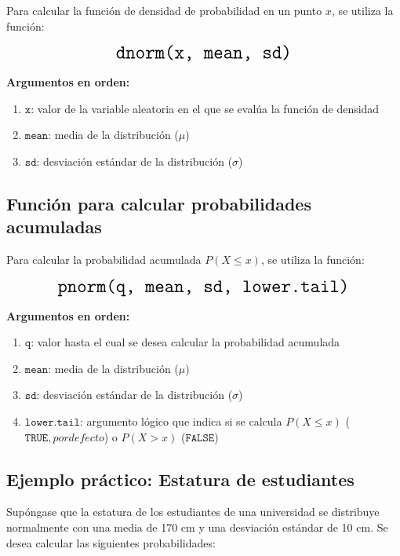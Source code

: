 \documentclass[
  spanish,
  letterpaper,
]{book}
\begin{document}
Para calcular la función de densidad de probabilidad en un punto \(x\),
se utiliza la función:

\[\LARGE \texttt{dnorm(x, mean, sd)}  \]

\textbf{Argumentos en orden:}

\begin{enumerate}
\def\labelenumi{\arabic{enumi}.}
\item
  \(\texttt{x}\): valor de la variable aleatoria en el que se evalúa la
  función de densidad
\item
  \(\texttt{mean}\): media de la distribución (\(\mu\))
\item
  \(\texttt{sd}\): desviación estándar de la distribución (\(\sigma\))
\end{enumerate}

\subsection{Función para calcular probabilidades
acumuladas}\label{funciuxf3n-para-calcular-probabilidades-acumuladas}

Para calcular la probabilidad acumulada \(P(X \leq x)\), se utiliza la
función:

\[\LARGE \texttt{pnorm(q, mean, sd, lower.tail)}  \]

\textbf{Argumentos en orden:}

\begin{enumerate}
\def\labelenumi{\arabic{enumi}.}
\item
  \(\texttt{q}\): valor hasta el cual se desea calcular la probabilidad
  acumulada
\item
  \(\texttt{mean}\): media de la distribución (\(\mu\))
\item
  \(\texttt{sd}\): desviación estándar de la distribución (\(\sigma\))
\item
  \(\texttt{lower.tail}\): argumento lógico que indica si se calcula
  \(P(X \leq x)\) (\(\texttt{TRUE}, por defecto\)) o \(P(X > x)\)
  (\(\texttt{FALSE}\))
\end{enumerate}

\subsection{Ejemplo práctico: Estatura de
estudiantes}\label{ejemplo-pruxe1ctico-estatura-de-estudiantes}

Supóngase que la estatura de los estudiantes de una universidad se
distribuye normalmente con una media de 170 cm y una desviación estándar
de 10 cm. Se desea calcular las siguientes probabilidades:
\end{document}
